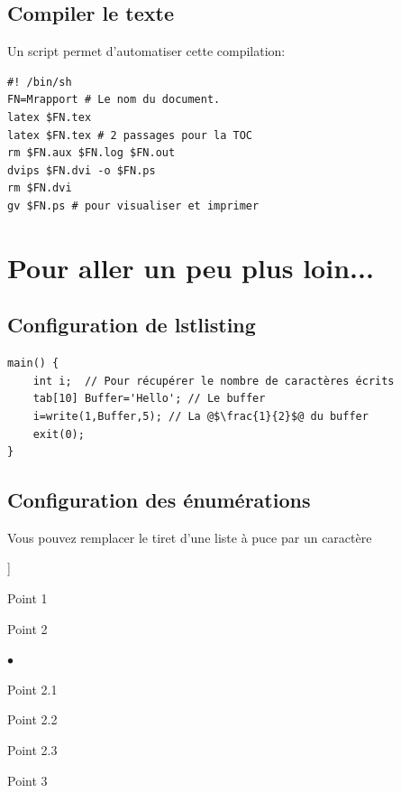 \subsection {Compiler le texte}
Un script permet d'automatiser cette compilation:
\begin{lstlisting}
#! /bin/sh
FN=Mrapport # Le nom du document.
latex $FN.tex
latex $FN.tex # 2 passages pour la TOC
rm $FN.aux $FN.log $FN.out
dvips $FN.dvi -o $FN.ps
rm $FN.dvi
gv $FN.ps # pour visualiser et imprimer
\end{lstlisting}

\section{Pour aller un peu plus loin...}
\subsection{Configuration de lstlisting}

\begin{lstlisting}
main() {
	int i;  // Pour récupérer le nombre de caractères écrits
	tab[10] Buffer='Hello'; // Le buffer
	i=write(1,Buffer,5); // La @$\frac{1}{2}$@ du buffer
	exit(0);
}
\end{lstlisting}

\subsection{Configuration des énumérations}
Vous pouvez remplacer le tiret d'une liste à puce par un caractère
\begin{list}{]}{}
\item Point 1
\item Point 2
	\begin{list}{$\bullet$}{}
	\item Point 2.1
	\item Point 2.2
	\item Point 2.3
	\end{list}
\item Point 3
\end{list}

